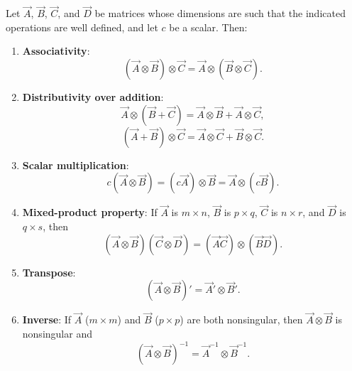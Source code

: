 \begin{proposition}
\label{prop:kronecker-properties}
Let $\vec{A}$, $\vec{B}$, $\vec{C}$, and $\vec{D}$ be matrices whose
dimensions are such that the indicated operations are well defined, and
let $c$ be a scalar.  Then:
\begin{enumerate}[label=(\alph*)]
  \item \textbf{Associativity}:
    \begin{equation}
      (\vec{A} \otimes \vec{B}) \otimes \vec{C}
      = \vec{A} \otimes (\vec{B} \otimes \vec{C}).
      \label{eq:A.13}
    \end{equation}

  \item \textbf{Distributivity over addition}:
    \begin{equation}
      \vec{A} \otimes (\vec{B} + \vec{C})
      = \vec{A} \otimes \vec{B} + \vec{A} \otimes \vec{C},
      \label{eq:A.14}
    \end{equation}
    \begin{equation}
      (\vec{A} + \vec{B}) \otimes \vec{C}
      = \vec{A} \otimes \vec{C} + \vec{B} \otimes \vec{C}.
      \label{eq:A.15}
    \end{equation}

  \item \textbf{Scalar multiplication}:
    \begin{equation}
      c(\vec{A} \otimes \vec{B})
      = (c\vec{A}) \otimes \vec{B}
      = \vec{A} \otimes (c\vec{B}).
      \label{eq:A.16}
    \end{equation}

  \item \textbf{Mixed-product property}: If $\vec{A}$ is $m \times n$,
    $\vec{B}$ is $p \times q$, $\vec{C}$ is $n \times r$, and
    $\vec{D}$ is $q \times s$, then
    \begin{equation}
      (\vec{A} \otimes \vec{B})(\vec{C} \otimes \vec{D})
      = (\vec{A}\vec{C}) \otimes (\vec{B}\vec{D}).
      \label{eq:A.17}
    \end{equation}

  \item \textbf{Transpose}:
    \begin{equation}
      (\vec{A} \otimes \vec{B})'
      = \vec{A}' \otimes \vec{B}'.
      \label{eq:A.18}
    \end{equation}

  \item \textbf{Inverse}: If $\vec{A}$ ($m \times m$) and $\vec{B}$
    ($p \times p$) are both nonsingular, then $\vec{A} \otimes \vec{B}$
    is nonsingular and
    \begin{equation}
      (\vec{A} \otimes \vec{B})^{-1}
      = \vec{A}^{-1} \otimes \vec{B}^{-1}.
      \label{eq:A.19}
    \end{equation}


\end{enumerate}
\end{proposition}
